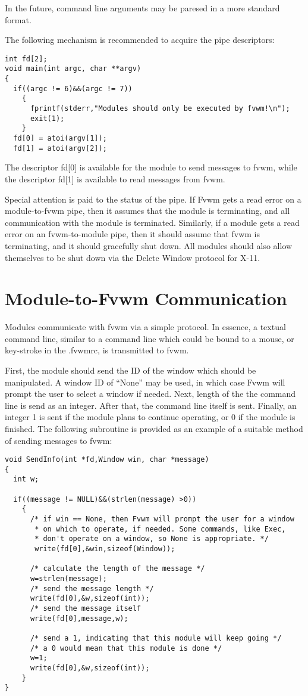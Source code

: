 In the future, command line arguments may
be paresed in a more standard format.

The following mechanism is recommended to acquire the pipe
descriptors:
\begin{verbatim}
int fd[2];
void main(int argc, char **argv)
{
  if((argc != 6)&&(argc != 7))
    {	
      fprintf(stderr,"Modules should only be executed by fvwm!\n");
      exit(1);
    }
  fd[0] = atoi(argv[1]);
  fd[1] = atoi(argv[2]);

\end{verbatim}
The descriptor fd[0] is available for the module to send messages to
fvwm, while the descriptor fd[1] is available to read messages from
fvwm.

Special attention is paid to the status of the pipe. If Fvwm gets a
read error on a module-to-fvwm  pipe, then it assumes that the module 
is terminating,
and all communication with the module is terminated. Similarly, if a
module gets a read error on an fvwm-to-module pipe, then it should
assume that fvwm is terminating, and it should gracefully shut down.
All modules should also allow themselves to be shut down via the
Delete Window protocol for X-11.

\section{Module-to-Fvwm Communication}
Modules communicate with fvwm via a simple protocol. In essence, a
textual command line, similar to a command line which could be bound
to a mouse, or key-stroke in the .fvwmrc, is transmitted to fvwm.

First, the module should send the ID of the window which should be
manipulated. A window ID of ``None'' may be used, in which case Fvwm
will prompt the user to select  a window if needed. Next, length of
the the command line is send as an integer. After that, the command
line itself is sent. Finally, an integer 1 is sent if the module plans
to continue operating, or 0 if the module is finished. The following
subroutine is provided as an example of a suitable method of sending
messages to fvwm:
\begin{verbatim}
void SendInfo(int *fd,Window win, char *message)
{
  int w;

  if((message != NULL)&&(strlen(message) >0))
    {	
      /* if win == None, then Fvwm will prompt the user for a window
       * on which to operate, if needed. Some commands, like Exec,
       * don't operate on a window, so None is appropriate. */
       write(fd[0],&win,sizeof(Window));
      
      /* calculate the length of the message */
      w=strlen(message);
      /* send the message length */
      write(fd[0],&w,sizeof(int));
      /* send the message itself
      write(fd[0],message,w);

      /* send a 1, indicating that this module will keep going */
      /* a 0 would mean that this module is done */
      w=1;
      write(fd[0],&w,sizeof(int));
    }
}
\end{verbatim}

